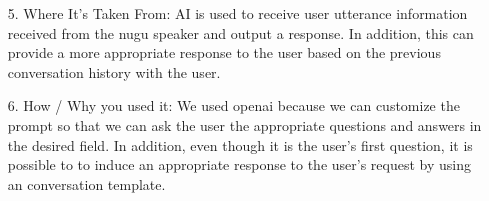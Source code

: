 \documentclass[conference]{IEEEtran}
\begin{document}
\begin{itemize}
\begin{itemize}
    \end{itemize}

    \item[5.] Where It's Taken From: AI is used to receive user utterance information received from the nugu speaker and output a response. In addition, this can provide a more appropriate response to the user based on the previous conversation history with the user.\\
    
    \item[6.] How / Why you used it: We used openai because we can customize the prompt so that we can ask the user the appropriate questions and answers in the desired field. In addition, even though it is the user's first question, it is possible to to induce an appropriate response to the user's request by using an conversation template.\\
\end{itemize}



 

\end{document}
